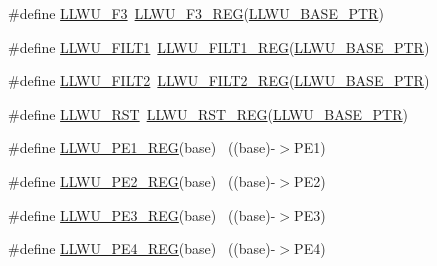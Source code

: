 \begin{DoxyCompactItemize}
\item 
\#define \hyperlink{group___l_l_w_u___register___accessor___macros_gaaf3f95074e10d498b1522014ab7d5bfe}{L\+L\+W\+U\+\_\+\+F3}~\hyperlink{group___l_l_w_u___register___accessor___macros_ga8369b30780db4c76aa70c8adf1a763fa}{L\+L\+W\+U\+\_\+\+F3\+\_\+\+R\+EG}(\hyperlink{group___l_l_w_u___peripheral_ga89c97b9e8756088cb3d8617c022ae6ac}{L\+L\+W\+U\+\_\+\+B\+A\+S\+E\+\_\+\+P\+TR})
\item 
\#define \hyperlink{group___l_l_w_u___register___accessor___macros_ga0ccd44a49b9f822b80e5d8c4935d94fe}{L\+L\+W\+U\+\_\+\+F\+I\+L\+T1}~\hyperlink{group___l_l_w_u___register___accessor___macros_ga1c17851f00a54116b482596824ddd13c}{L\+L\+W\+U\+\_\+\+F\+I\+L\+T1\+\_\+\+R\+EG}(\hyperlink{group___l_l_w_u___peripheral_ga89c97b9e8756088cb3d8617c022ae6ac}{L\+L\+W\+U\+\_\+\+B\+A\+S\+E\+\_\+\+P\+TR})
\item 
\#define \hyperlink{group___l_l_w_u___register___accessor___macros_gae5e6484abe7ce06b0e85852c098959e7}{L\+L\+W\+U\+\_\+\+F\+I\+L\+T2}~\hyperlink{group___l_l_w_u___register___accessor___macros_ga5b8d2b94b1ac6dfdf82b7eaee7760152}{L\+L\+W\+U\+\_\+\+F\+I\+L\+T2\+\_\+\+R\+EG}(\hyperlink{group___l_l_w_u___peripheral_ga89c97b9e8756088cb3d8617c022ae6ac}{L\+L\+W\+U\+\_\+\+B\+A\+S\+E\+\_\+\+P\+TR})
\item 
\#define \hyperlink{group___l_l_w_u___register___accessor___macros_gafcdb7fa78ef597a1df61a7baa2bb5890}{L\+L\+W\+U\+\_\+\+R\+ST}~\hyperlink{group___l_l_w_u___register___accessor___macros_ga2cd305f92495adf56b038b6f98471e2d}{L\+L\+W\+U\+\_\+\+R\+S\+T\+\_\+\+R\+EG}(\hyperlink{group___l_l_w_u___peripheral_ga89c97b9e8756088cb3d8617c022ae6ac}{L\+L\+W\+U\+\_\+\+B\+A\+S\+E\+\_\+\+P\+TR})
\item 
\#define \hyperlink{group___l_l_w_u___register___accessor___macros_gada86612bb2a3cb6d479429beaca258a8}{L\+L\+W\+U\+\_\+\+P\+E1\+\_\+\+R\+EG}(base)                                          ~((base)-\/$>$P\+E1)
\item 
\#define \hyperlink{group___l_l_w_u___register___accessor___macros_ga13e23bebded99c5538c165fec2ffa41f}{L\+L\+W\+U\+\_\+\+P\+E2\+\_\+\+R\+EG}(base)                                          ~((base)-\/$>$P\+E2)
\item 
\#define \hyperlink{group___l_l_w_u___register___accessor___macros_ga0b72bd64b08303c30d4de21aa8bb06b8}{L\+L\+W\+U\+\_\+\+P\+E3\+\_\+\+R\+EG}(base)                                          ~((base)-\/$>$P\+E3)
\item 
\#define \hyperlink{group___l_l_w_u___register___accessor___macros_gaff14d2acccbae996be61c4ba7893024f}{L\+L\+W\+U\+\_\+\+P\+E4\+\_\+\+R\+EG}(base)                                          ~((base)-\/$>$P\+E4)

\end{DoxyCompactItemize}
